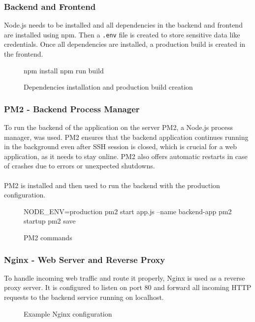 \documentclass[a4paper,12pt]{report}
\begin{document}
\subsubsection{Backend and Frontend}
Node.js needs to be installed and all dependencies in the backend and frontend are installed using npm. Then a \texttt{.env} file is created to store sensitive data like credentials. Once all dependencies are installed, a production build is created in the frontend.
\begin{figure}[H]
	\begin{terminal}
		npm install
		npm run build
	\end{terminal}
	\caption{Dependencies installation and production build creation}
\end{figure}
\subsubsection{PM2 - Backend Process Manager}
To run the backend of the application on the server PM2, a Node.js process manager, was used. PM2 ensures that the backend application continues running in the background even after SSH session is closed, which is crucial for a web application, as it needs to stay online. PM2 also offers automatic restarts in case of crashes due to errors or unexpected shutdowns.\\\\
PM2 is installed and then used to run the backend with the production configuration.
\begin{figure}[H]
	\begin{terminal}
		NODE_ENV=production pm2 start app.js --name backend-app
		pm2 startup
		pm2 save
	\end{terminal}
	\caption{PM2 commands}
\end{figure}
\subsubsection{Nginx - Web Server and Reverse Proxy}
To handle incoming web traffic and route it properly, Nginx is used as a reverse proxy server. It is configured to listen on port 80 and forward all incoming HTTP requests to the backend service running on localhost.
\begin{figure}[H]
	\caption{Example Nginx configuration}
\end{figure}
\end{document}
